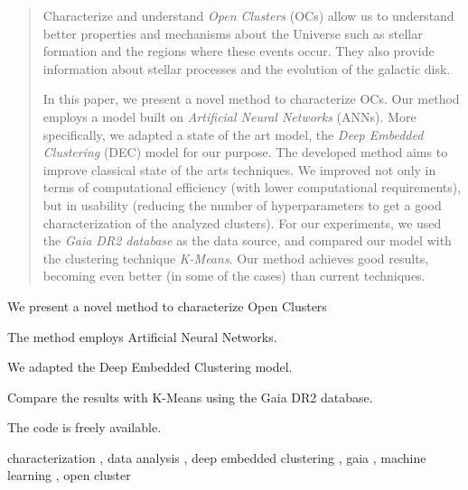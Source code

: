\documentclass[preprint,12pt,authoryear]{elsarticle}
\begin{document}
\begin{frontmatter}


\begin{abstract}
Characterize and understand \emph{Open Clusters} (OCs) allow us to understand better properties and mechanisms about the Universe such as stellar formation and the regions where these events occur. They also provide information about stellar processes and the evolution of the galactic disk.

In this paper, we present a novel method to characterize OCs. Our method employs a model built on \emph{Artificial Neural Networks} (ANNs). More specifically, we adapted a state of the art model, the \emph{Deep Embedded Clustering} (DEC) model for our purpose. The developed method aims to improve classical state of the arts techniques. We improved not only in terms of computational efficiency (with lower computational requirements), but in usability (reducing the number of hyperparameters to get a good characterization of the analyzed clusters). For our experiments, we used the \emph{Gaia DR2 database} as the data source, and compared our model with the clustering technique \emph{K-Means}. Our method achieves good results, becoming even better (in some of the cases) than current techniques.
\end{abstract}


\begin{highlights}
\item We present a novel method to characterize Open Clusters
\item The method employs Artificial Neural Networks.
\item We adapted the Deep Embedded Clustering model.
\item Compare the results with K-Means using the Gaia DR2 database.
\item The code is freely available.
\end{highlights}

\begin{keyword}
 characterization \sep
    data analysis  \sep
    deep embedded clustering  \sep
    gaia  \sep
    machine learning  \sep
    open cluster
\end{keyword}

\end{frontmatter}
\end{document}
